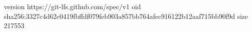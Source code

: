 version https://git-lfs.github.com/spec/v1
oid sha256:3327c4d62c0419fbffdf079feb903a857bb764afec916122b12aaf715bb90f9d
size 217553
